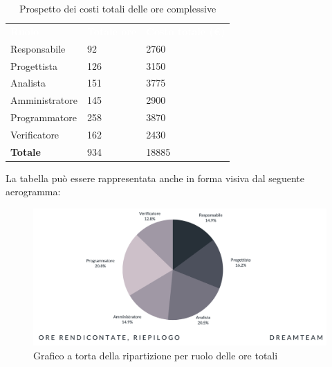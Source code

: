 \begin{table}[H]
\begin{center}
\renewcommand{\arraystretch}{1.5}
\begin{tabular}{ m{}<{\centering}  m{}<{\centering} m{}<{\centering}}
	\rowcolor{darkblue}
	\textcolor{white}{\textbf{Ruolo}}&\textcolor{white}{\textbf{Totale ore}}&\textcolor{white}{\textbf{Costo totale (\euro)}}\\ 

	Responsabile  & 92 & 2760 \\	
	
	Progettista & 126 & 3150 \\
	
	Analista & 151 & 3775 \\

	Amministratore & 145 & 2900 \\
	
	Programmatore & 258 & 3870 \\
	
	Verificatore & 162 & 2430 \\
	
	\textbf{Totale} & 934 & 18885 \\
	
\end{tabular}
\caption{Prospetto dei costi totali delle ore complessive}
\end{center}
\end{table}

La tabella può essere rappresentata anche in forma visiva dal seguente aerogramma:
\begin{figure}[H]
\centering
\includegraphics[scale=0.53]{Sezioni/SezioniPreventivo/grafici/Riepilogo_ore_totali_costi.png}
\caption{Grafico a torta della ripartizione per ruolo delle ore totali}
\end{figure}



